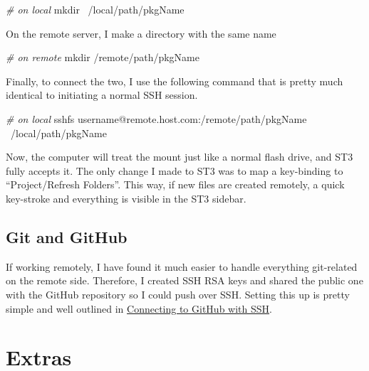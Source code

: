 \documentclass[]{book}
\newenvironment{Shaded}{\begin{snugshade}}{\end{snugshade}}
\newcommand{\CommentTok}[1]{\textcolor[rgb]{0.56,0.35,0.01}{\textit{#1}}}
\newcommand{\ExtensionTok}[1]{#1}
\newcommand{\FunctionTok}[1]{\textcolor[rgb]{0.00,0.00,0.00}{#1}}
\newcommand{\NormalTok}[1]{#1}
\begin{document}
\begin{Shaded}
\begin{Highlighting}[]
\CommentTok{# on local}
\FunctionTok{mkdir}\NormalTok{ ~/local/path/pkgName}
\end{Highlighting}
\end{Shaded}

On the remote server, I make a directory with the same name

\begin{Shaded}
\begin{Highlighting}[]
\CommentTok{# on remote}
\FunctionTok{mkdir}\NormalTok{ /remote/path/pkgName}
\end{Highlighting}
\end{Shaded}

Finally, to connect the two, I use the following command that is pretty much identical to initiating a normal SSH session.

\begin{Shaded}
\begin{Highlighting}[]
\CommentTok{# on local}
\ExtensionTok{sshfs}\NormalTok{ username@remote.host.com:/remote/path/pkgName ~/local/path/pkgName}
\end{Highlighting}
\end{Shaded}

Now, the computer will treat the mount just like a normal flash drive, and ST3 fully accepts it. The only change I made to ST3 was to map a key-binding to ``Project/Refresh Folders''. This way, if new files are created remotely, a quick key-stroke and everything is visible in the ST3 sidebar.

\hypertarget{git-and-github-1}{%
\subsection{Git and GitHub}\label{git-and-github-1}}

If working remotely, I have found it much easier to handle everything git-related on the remote side. Therefore, I created SSH RSA keys and shared the public one with the GitHub repository so I could push over SSH. Setting this up is pretty simple and well outlined in \href{https://help.github.com/en/articles/connecting-to-github-with-SSH}{Connecting to GitHub with SSH}.

\hypertarget{extras}{%
\section{Extras}\label{extras}}
\end{document}
